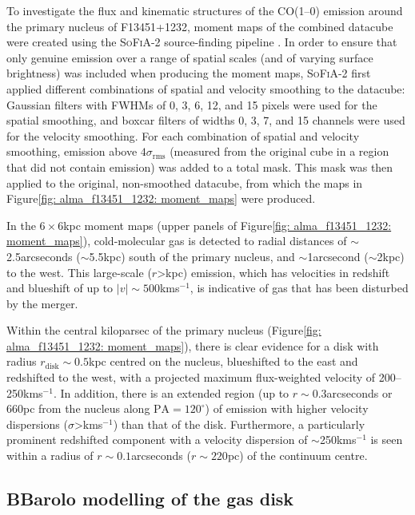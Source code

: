 To investigate the flux and kinematic structures of the CO(1--0) emission around the primary nucleus of F13451+1232, moment maps of the combined datacube were created using the \textsc{SoFiA-2} source-finding pipeline \citep{Serra2015, Serra2021}. In order to ensure that only genuine emission over a range of spatial scales (and of varying surface brightness) was included when producing the moment maps, \textsc{SoFiA-2} first applied different combinations of spatial and velocity smoothing to the datacube: Gaussian filters with FWHMs of 0, 3, 6, 12, and 15 pixels were used for the spatial smoothing, and boxcar filters of widths 0, 3, 7, and 15 channels were used for the velocity smoothing. For each combination of spatial and velocity smoothing, emission above $4\sigma_\mathrm{rms}$ (measured from the original cube in a region that did not contain emission) was added to a total mask. This mask was then applied to the original, non-smoothed datacube, from which the maps in Figure\;\ref{fig: alma_f13451_1232: moment_maps} were produced. 

In the $6\times6$\;kpc moment maps (upper panels of Figure\;\ref{fig: alma_f13451_1232: moment_maps}), cold-molecular gas is detected to radial distances of $\sim$2.5\;arcseconds ($\sim$5.5\;kpc) south of the primary nucleus, and $\sim$1\;arcsecond ($\sim$2\;kpc) to the west. This large-scale ($r$\;\textgreater{}\;kpc) emission, which has velocities in redshift and blueshift of up to $|v|\sim500$\;km\;s$^{-1}$, is indicative of gas that has been disturbed by the merger.

Within the central kiloparsec of the primary nucleus (Figure\;\ref{fig: alma_f13451_1232: moment_maps}), there is clear evidence for a disk with radius $r_\mathrm{disk}\sim0.5$\;kpc centred on the nucleus, blueshifted to the east and redshifted to the west, with a projected maximum flux-weighted velocity of 200--250\;km\;s$^{-1}$. In addition, there is an extended region (up to $r\sim0.3$\;arcseconds or 660\;pc from the nucleus along $\mathrm{PA}=120^\circ$) of emission with higher velocity dispersions ($\sigma$\;\textgreater{}\;km\;s$^{-1}$) than that of the disk. Furthermore, a particularly prominent redshifted component with a velocity dispersion of $\sim$250\;km\;s$^{-1}$ is seen within a radius of $r\sim0.1$\;arcseconds ($r\sim220$\;pc) of the continuum centre.


\subsection{BBarolo modelling of the gas disk}
\label{section: alma_f13451_1232: analysis_and_results: disk}


